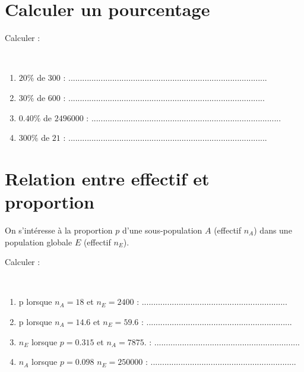 	\section{Calculer un pourcentage}
	Calculer :
	\begin{questions}
		
	
		\question[2] \ 
		
		\begin{enumerate}[label=\alph*)]
			
			\item $20 \%$ de $\num{300}$ :  ......................................................................................
			\item $30 \%$ de $\num{600}$ : .....................................................................................
			\item $\num{0.40} \%$ de $\num{2496000}$ : ..................................................................................
			\item $300 \%$ de $\num{21}$ : ......................................................................................
		\end{enumerate}
	\end{questions}
	
	
\section{Relation entre effectif et proportion}

On s'intéresse à la proportion $p$ d'une sous-population $A$ (effectif $n_A$) dans une population globale $E$ (effectif $n_E$).

Calculer :
\begin{questions}

	
	\question[4] \
	
	\begin{enumerate}[label=\alph*)]
		
		\item p lorsque $n_A=\num{18}$ et $n_E= \num{2400}$ : ...............................................................
		\item p lorsque $n_A=\num{14.6}$ et $n_E= \num{59.6} $ :  ...............................................................
		\item $n_E$ lorsque $p=\num{0.315} $ et $n_A=\num{7875}.$ : ...............................................................
		\item $n_A$ lorsque $p=\num{0.098}$ $n_E= \num{250000}$ : ...............................................................
		\end{enumerate}
\end{questions}



